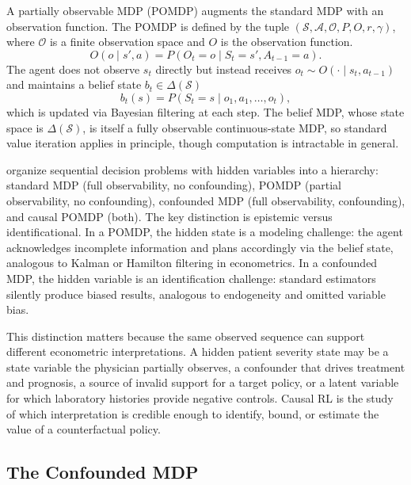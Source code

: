 A partially observable MDP (POMDP) augments the standard MDP with an observation function. The POMDP is defined by the tuple $(\mathcal{S}, \mathcal{A}, \mathcal{O}, P, O, r, \gamma)$, where $\mathcal{O}$ is a finite observation space and $O$ is the observation function.
\begin{equation}
O(o \mid s', a) = P(O_t = o \mid S_t = s', A_{t-1} = a).
\label{eq:pomdp_obs}
\end{equation}
The agent does not observe $s_t$ directly but instead receives $o_t \sim O(\cdot \mid s_t, a_{t-1})$ and maintains a belief state $b_t \in \Delta(\mathcal{S})$
\begin{equation}
b_t(s) = P(S_t = s \mid o_1, a_1, \ldots, o_t),
\label{eq:belief_state}
\end{equation}
which is updated via Bayesian filtering at each step. The belief MDP, whose state space is $\Delta(\mathcal{S})$, is itself a fully observable continuous-state MDP, so standard value iteration applies in principle, though computation is intractable in general.

\citet{dacostacunha2025unifying} organize sequential decision problems with hidden variables into a hierarchy: standard MDP (full observability, no confounding), POMDP (partial observability, no confounding), confounded MDP (full observability, confounding), and causal POMDP (both). The key distinction is epistemic versus identificational. In a POMDP, the hidden state is a modeling challenge: the agent acknowledges incomplete information and plans accordingly via the belief state, analogous to Kalman or Hamilton filtering in econometrics. In a confounded MDP, the hidden variable is an identification challenge: standard estimators silently produce biased results, analogous to endogeneity and omitted variable bias.

This distinction matters because the same observed sequence can support different econometric interpretations. A hidden patient severity state may be a state variable the physician partially observes, a confounder that drives treatment and prognosis, a source of invalid support for a target policy, or a latent variable for which laboratory histories provide negative controls. Causal RL is the study of which interpretation is credible enough to identify, bound, or estimate the value of a counterfactual policy.

\subsection{The Confounded MDP}
\label{subsec:confounded_mdp}


